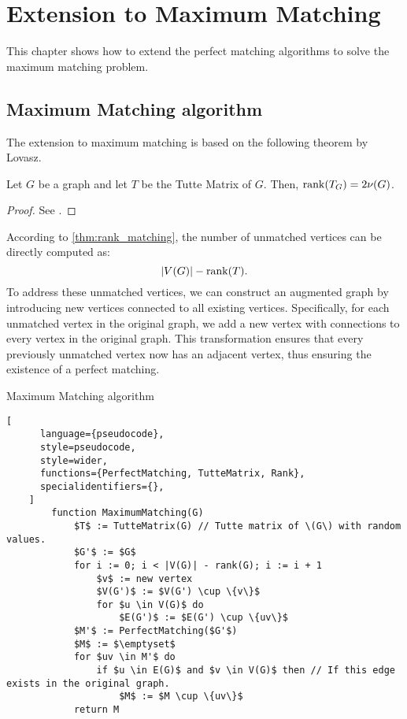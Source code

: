 \chapter{Extension to Maximum Matching}
\label{chap:maximum_matching}

This chapter shows how to extend the perfect matching algorithms to solve the maximum matching problem.

\section{Maximum Matching algorithm}

The extension to maximum matching is based on the following theorem by Lovasz.
\begin{theorem}
\label{thm:rank_matching}
    Let \(G\) be a graph and let \(T\) be the Tutte Matrix of \(G\).
    Then, \(\operatorname{rank}(T_G) = 2\nu(G)\).
\end{theorem}

\begin{proof}
  See \citet[p.~560]{Rabin1989}.
\end{proof}

According to \cref{thm:rank_matching}, the number of unmatched vertices can be directly computed as:
\[
    |V(G)| - \operatorname{rank}(T).
\]
To address these unmatched vertices, we can construct an augmented graph by introducing new vertices connected to all existing vertices. 
Specifically, for each unmatched vertex in the original graph, we add a new vertex with connections to every vertex in the original graph. 
This transformation ensures that every previously unmatched vertex now has an adjacent vertex, thus ensuring the existence of a perfect matching.

\newpage
\begin{programruledcaption}{Maximum Matching algorithm}
    \begin{lstlisting}[
      language={pseudocode},
      style=pseudocode,
      style=wider,
      functions={PerfectMatching, TutteMatrix, Rank},
      specialidentifiers={},
    ]
        function MaximumMatching(G)
            $T$ := TutteMatrix(G) // Tutte matrix of \(G\) with random values.
            $G'$ := $G$
            for i := 0; i < |V(G)| - rank(G); i := i + 1 
                $v$ := new vertex
                $V(G')$ := $V(G') \cup \{v\}$
                for $u \in V(G)$ do 
                    $E(G')$ := $E(G') \cup \{uv\}$
            $M'$ := PerfectMatching($G'$)
            $M$ := $\emptyset$
            for $uv \in M'$ do 
                if $u \in E(G)$ and $v \in V(G)$ then // If this edge exists in the original graph.
                    $M$ := $M \cup \{uv\}$
            return M
    \end{lstlisting}
\end{programruledcaption}

